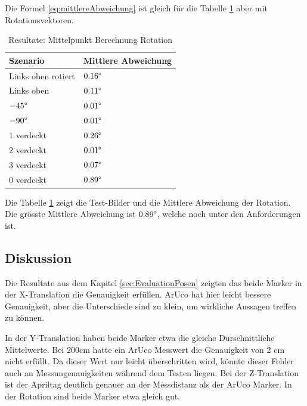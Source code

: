 Die Formel \ref{eq:mittlereAbweichung} ist gleich für die Tabelle \ref{tab:MittelpunktRotation} aber mit Rotationsvektoren.

\begin{table}[!htb]
    \caption{Resultate: Mittelpunkt Berechnung Rotation}
    \label{tab:MittelpunktRotation}
    \begin{tabular}{|l|l|}
            \hline
            Szenario &  Mittlere Abweichung\\
            \hline
            Links oben rotiert & \(0.16\degree\)\\
            \hline
            Links oben & \(0.11\degree\)\\
            \hline
            \(-45 \degree\) & \(0.01\degree\)\\
            \hline
            \(-90 \degree\) & \(0.01\degree\)\\
            \hline
            1 verdeckt & \(0.26\degree\)\\
            \hline
            2 verdeckt & \(0.01\degree\)\\
            \hline
            3 verdeckt & \(0.07\degree\)\\
            \hline
            0 verdeckt & \(0.89\degree\)\\
            \hline
    \end{tabular}
\end{table}

Die Tabelle \ref{tab:MittelpunktRotation} zeigt die Test-Bilder und die Mittlere Abweichung der Rotation.
Die grösste Mittlere Abweichung ist \(0.89\degree\), welche noch unter den Anforderungen ist.


\subsection{Diskussion}

Die Resultate aus dem Kapitel \ref{sec:EvaluationPosen} zeigten das beide Marker in der X-Translation die Genauigkeit erfüllen.
ArUco hat hier leicht bessere Genauigkeit, aber die Unterschiede sind zu klein, um wirkliche Aussagen treffen zu können.

In der Y-Translation haben beide Marker etwa die gleiche Durschnittliche Mittelwerte. 
Bei 200cm hatte ein ArUco Messwert die Genauigkeit von 2 cm nicht erfüllt. 
Da dieser Wert nur leicht überschritten wird, könnte dieser Fehler auch an Messungenauigkeiten während dem Testen liegen.
Bei der Z-Translation ist der Apriltag deutlich genauer an der Messdistanz als der ArUco Marker.
In der Rotation sind beide Marker etwa gleich gut.

